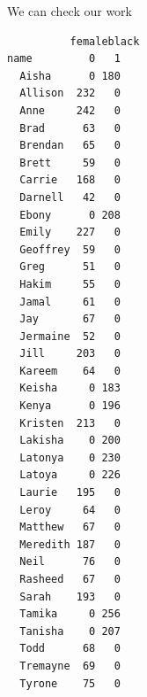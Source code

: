 \documentclass[
  letterpaper,
  DIV=11,
  numbers=noendperiod]{scrreprt}
\newenvironment{Shaded}{\begin{snugshade}}{\end{snugshade}}
\newcommand{\AttributeTok}[1]{\textcolor[rgb]{0.40,0.45,0.13}{#1}}
\newcommand{\CommentTok}[1]{\textcolor[rgb]{0.37,0.37,0.37}{#1}}
\newcommand{\ConstantTok}[1]{\textcolor[rgb]{0.56,0.35,0.01}{#1}}
\newcommand{\DecValTok}[1]{\textcolor[rgb]{0.68,0.00,0.00}{#1}}
\newcommand{\FunctionTok}[1]{\textcolor[rgb]{0.28,0.35,0.67}{#1}}
\newcommand{\NormalTok}[1]{\textcolor[rgb]{0.00,0.23,0.31}{#1}}
\newcommand{\OtherTok}[1]{\textcolor[rgb]{0.00,0.23,0.31}{#1}}
\newcommand{\SpecialCharTok}[1]{\textcolor[rgb]{0.37,0.37,0.37}{#1}}
\newcommand{\StringTok}[1]{\textcolor[rgb]{0.13,0.47,0.30}{#1}}
\begin{document}
\begin{Shaded}
\end{Shaded}

We can check our work

\begin{Shaded}
\end{Shaded}

\begin{verbatim}
          femaleblack
name         0   1
  Aisha      0 180
  Allison  232   0
  Anne     242   0
  Brad      63   0
  Brendan   65   0
  Brett     59   0
  Carrie   168   0
  Darnell   42   0
  Ebony      0 208
  Emily    227   0
  Geoffrey  59   0
  Greg      51   0
  Hakim     55   0
  Jamal     61   0
  Jay       67   0
  Jermaine  52   0
  Jill     203   0
  Kareem    64   0
  Keisha     0 183
  Kenya      0 196
  Kristen  213   0
  Lakisha    0 200
  Latonya    0 230
  Latoya     0 226
  Laurie   195   0
  Leroy     64   0
  Matthew   67   0
  Meredith 187   0
  Neil      76   0
  Rasheed   67   0
  Sarah    193   0
  Tamika     0 256
  Tanisha    0 207
  Todd      68   0
  Tremayne  69   0
  Tyrone    75   0
\end{verbatim}
\end{document}
